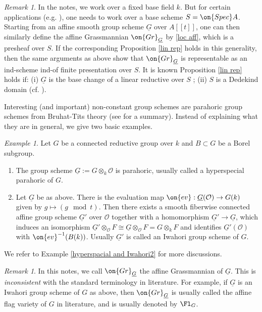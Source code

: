 \documentclass[]{pcmi}
\theoremstyle{plain}
\theoremstyle{remark}
\newtheorem{ex}[equation]{Example}
\newtheorem{rmk}[equation]{Remark}
\theoremstyle{definition}
\newcommand{\mO}{{\mathcal O}}
\newcommand{\Gr}{{\on{Gr}}}
\newcommand{\Spec}{\on{Spec}}
\begin{document}
\begin{rmk}\label{general base}
In the notes, we work over a fixed base field $k$. But for certain applications (e.g. \cite{PR2,PZ}), one needs to work over a base scheme $S=\Spec A$. Starting from an affine smooth group scheme $\underline G$ over $A[[t]]$, one can then similarly define the affine Grassmannian $\Gr_{\underline G}$ by \eqref{loc aff}, which is a presheaf over $S$. If the corresponding Proposition \ref{lin rep} holds in this generality, then the same arguments as above show that $\Gr_{\underline G}$ is representable as an ind-scheme ind-of finite presentation over $S$. It is known Proposition \ref{lin rep} holds if: (i) $\underline G$ is the base change of a linear reductive over $S$ ; (ii) $S$ is a Dedekind domain (cf. \cite[Appendix]{PZ}).
\end{rmk}

Interesting (and important) non-constant group schemes are parahoric group schemes from Bruhat-Tits theory (see \cite{Ti} for a summary). Instead of explaining what they are in general, we give two basic examples. 
\begin{ex}\label{hyperspacial and Iwahori}
Let $G$ be a connected reductive group over $k$ and $B\subset G$ be a Borel subgroup.
\begin{enumerate}
\item The group scheme $\underline G:=G\otimes_k \mO$ is parahoric, usually called a hyperspecial parahoric of $G$. 
\item Let $\underline G$ be as above. There is the evaluation map $\on{ev}: \underline G(\mO)\to G(k)$ given by $g\mapsto (g\mod t)$. Then there exists a smooth fiberwise connected affine group scheme $\underline G'$ over $\mO$ together with a homomorphism $\underline G'\to \underline G$, which induces an isomorphism $\underline G'\otimes_{\mO}F\cong \underline G\otimes_\mO F=G\otimes_k F$ and identifies $\underline G'(\mO)$ with $\on{ev}^{-1}(B(k))$. Usually $\underline G'$ is called an Iwahori group scheme of $G$. 
\end{enumerate}
We refer to Example \ref{hyperspacial and Iwahori2} for more discussions.
\end{ex}
\begin{rmk}\label{terminology} 
In this notes, we call $\Gr_{\underline G}$ the affine Grassmannian of $\underline G$. This is \emph{inconsistent} with the standard terminology in literature. For example,
if $\underline G$ is an Iwahori group scheme of $G$ as above, then $\Gr_{\underline G}$  is usually called the affine flag variety of $G$ in literature, and is usually denoted by $\Fl_{G}$.
\end{rmk}
\end{document}
